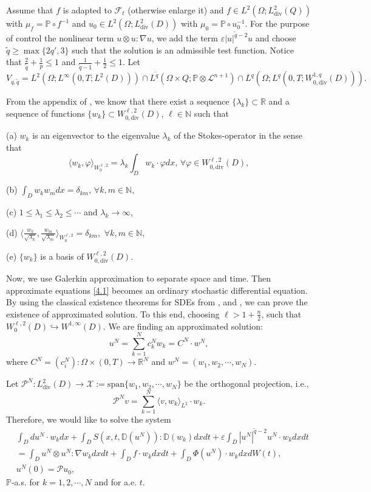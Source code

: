 \documentclass[reqno]{amsart}
\theoremstyle{definition}
\theoremstyle{remark}
\numberwithin{equation}{section} \allowdisplaybreaks
\begin{document}
Assume that $f$ is adapted to %
$\mathscr{F}_t$ (otherwise enlarge it) and $f\in
L^2(\Omega;L^2_{\text{div}}(Q))$ with $\mu_f=\mathbb{P}\circ f^{-1}$
and $u_0\in L^2(\Omega;L^2_{\text{div}}(D))$ with
$\mu_0=\mathbb{P}\circ u_0^{-1}$. For the purpose of control the
nonlinear term $u\otimes u:\nabla u$, we add the term
$\varepsilon|u|^{\tilde{q}-2}u$  and choose $\tilde{q}\geq\max
\{2q',3\}$ such that the solution is an admissible test function.
Notice that $\frac{2}{\tilde{q}}+\frac{1}{p}\leq1$ and
$\frac{1}{\tilde{q}-1}+\frac{1}{2}\leq1$.  Let
$$V_{q,\tilde{q}}=L^2(\Omega;L^\infty(0,T;L^2(D)))\cap L^{\tilde{q}}(\Omega\times Q; \mathbb{P}\otimes \mathcal{L}^{n+1})\cap L^q (\Omega; L^q(0,T;W_{0,\text{div}}^{1,q}(D))).$$

From the appendix of \cite{JMJNMRMR}, we know that there exist a
sequence $\{\lambda_k\}\subset \mathbb{R}$ and a sequence of
functions $\{w_k\}\subset W_{0,\text{div}}^{\ell,2}(D)$, $\ell\in
\mathbb{N}$ such that

 (a) $w_k$ is an eigenvector
to the eigenvalue $\lambda_k$ of the Stokes-operator in the sense
that
$$\langle w_k, \varphi\rangle_{W_0^{\ell,2}}=\lambda_k\int_Dw_k\cdot\varphi dx,\, \forall \varphi\in W_{0,\text{div}}^{\ell,2}(D),$$

(b) $\int_D w_kw_m dx=\delta_{km},\, \forall k,m\in \mathbb{N},$

(c) $1\leq\lambda_1\leq\lambda_2\leq\cdots$ and
$\lambda_k\rightarrow\infty$,

(d)
$\langle\frac{w_k}{\sqrt{\lambda_k}},\frac{w_m}{\sqrt{\lambda_m}}\rangle_{W_0^{\ell,2}}=\delta_{km}$,\,
$\forall k,m\in \mathbb{N},$

 (e) $\{w_k\}$ is a basis of $W_{0,\text{div}}^{\ell,2}(D).$

Now, we use Galerkin approximation to separate space and time. Then
approximate equations \eqref{4.1} becomes an ordinary stochastic
differential equation. By using the classical existence theorems for
SDEs from \cite{LA}, \cite{AF1} and \cite{AF2}, we can prove the
existence of approximated solution. To this end, choosing
$\ell>1+\frac{n}{2}$, such that $W_0^{\ell,2}(D)\hookrightarrow
W^{1,\infty}(D)$. We are finding an approximated solution:
$$u^N=\sum_{k=1}^N c_k^Nw_k=C^N\cdot w^N,$$ where
$C^N=(c_i^N):\Omega\times (0,T)\rightarrow \mathbb{R}^N$ and
$w^N=(w_1,w_2,\cdots,w_N)$.

Let $\mathcal{P}^N: L^2_{\text{div}}(D)\rightarrow
\mathcal{X}:=\text{span}\{w_1,w_2,\cdots,w_N\}$ be the orthogonal
projection, i.e.,
$$\mathcal{P}^Nv=\sum_{k=1}^N\langle v,w_k\rangle_{L^2}\cdot w_k.$$
Therefore,  we would like to solve the system
\begin{equation}\label{4.2}
\begin{split}
&\int_{D}du^N\cdot
w_kdx+\int_{D}S(x,t,\mathbb{D}(u^N)):\mathbb{D}(w_k)dxdt+\varepsilon\int_{D}|u^N|^{\tilde{q}-2}u^N\cdot
w_k dxdt\\&=\int_{D}u^N\otimes u^N :\nabla w_kdxdt
+\int_{D}f\cdot w_k  dxdt+\int_{D}\Phi(u^N)\cdot w_k dxdW(t),\\
&u^N(0)=\mathcal{P}u_0,
\end{split}
\end{equation}
$\mathbb{P}$-a.s. for $k=1,2,\cdots, N$ and for a.e. $t$.
\end{document}
